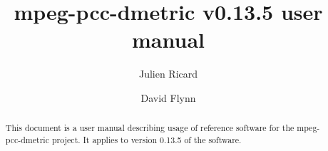 \documentclass[a4paper,11pt]{mpegdoc}
\title{mpeg-pcc-dmetric v0.13.5 user manual}
\author{%
  Julien Ricard \email{julien.ricard@technicolor.com}
 \and
  David Flynn \email{davidflynn@apple.com}
}
\begin{document}
\maketitle
\begin{abstract}
This document is a user manual describing usage of reference software
for the mpeg-pcc-dmetric project. It applies to version 0.13.5 of the software.
\end{abstract}
\newpage
\tableofcontents

\newpage







%
\end{document}
